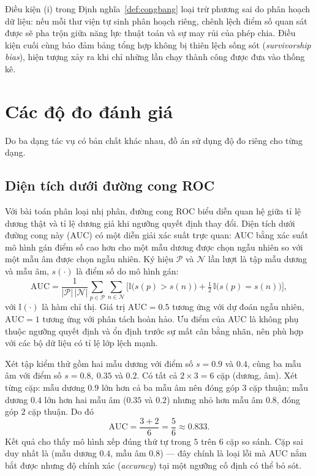 Điều kiện (i) trong Định nghĩa~\ref{def:congbang} loại trừ phương sai do phân
hoạch dữ liệu: nếu mỗi thư viện tự sinh phân hoạch riêng, chênh lệch điểm số quan
sát được sẽ pha trộn giữa năng lực thuật toán và sự may rủi của phép chia. Điều
kiện cuối cùng bảo đảm bảng tổng hợp không bị thiên lệch sống sót
(\textit{survivorship bias}), hiện tượng xảy ra khi chỉ những lần chạy thành công
được đưa vào thống kê.

\section{Các độ đo đánh giá}
\label{sec:dodo-lythuyet}
Do ba dạng tác vụ có bản chất khác nhau, đồ án sử dụng độ đo riêng cho từng dạng.

\subsection{Diện tích dưới đường cong ROC}
Với bài toán phân loại nhị phân, đường cong ROC biểu diễn quan hệ giữa tỉ lệ dương
thật và tỉ lệ dương giả khi ngưỡng quyết định thay đổi. Diện tích dưới đường cong
này (AUC) có một diễn giải xác suất trực quan: AUC bằng xác suất mô hình gán điểm
số cao hơn cho một mẫu dương được chọn ngẫu nhiên so với một mẫu âm được chọn ngẫu
nhiên. Ký hiệu $\mathcal{P}$ và $\mathcal{N}$ lần lượt là tập mẫu dương và mẫu âm,
$s(\cdot)$ là điểm số do mô hình gán:
\[
    \mathrm{AUC} = \frac{1}{|\mathcal{P}|\,|\mathcal{N}|}
    \sum_{p \in \mathcal{P}} \sum_{n \in \mathcal{N}}
    \Big[ \mathbb{I}\big(s(p) > s(n)\big) + \tfrac{1}{2}\,\mathbb{I}\big(s(p) = s(n)\big) \Big],
\]
với $\mathbb{I}(\cdot)$ là hàm chỉ thị. Giá trị $\mathrm{AUC} = 0.5$ tương ứng với
dự đoán ngẫu nhiên, $\mathrm{AUC} = 1$ tương ứng với phân tách hoàn hảo. Ưu điểm
của AUC là không phụ thuộc ngưỡng quyết định và ổn định trước sự mất cân bằng
nhãn, nên phù hợp với các bộ dữ liệu có tỉ lệ lớp lệch mạnh.

\begin{vidu}
\label{vd:auc}
Xét tập kiểm thử gồm hai mẫu dương với điểm số $s = 0.9$ và $0.4$, cùng ba mẫu âm
với điểm số $s = 0.8,\ 0.35$ và $0.2$. Có tất cả $2 \times 3 = 6$ cặp
(dương, âm). Xét từng cặp: mẫu dương $0.9$ lớn hơn cả ba mẫu âm nên đóng góp $3$
cặp thuận; mẫu dương $0.4$ lớn hơn hai mẫu âm ($0.35$ và $0.2$) nhưng nhỏ hơn mẫu
âm $0.8$, đóng góp $2$ cặp thuận. Do đó
\[
    \mathrm{AUC} = \frac{3 + 2}{6} = \frac{5}{6} \approx 0.833.
\]
Kết quả cho thấy mô hình xếp đúng thứ tự trong $5$ trên $6$ cặp so sánh. Cặp sai
duy nhất là (mẫu dương $0.4$, mẫu âm $0.8$) --- đây chính là loại lỗi mà AUC nắm
bắt được nhưng độ chính xác (\textit{accuracy}) tại một ngưỡng cố định có thể bỏ
sót.
\end{vidu}

